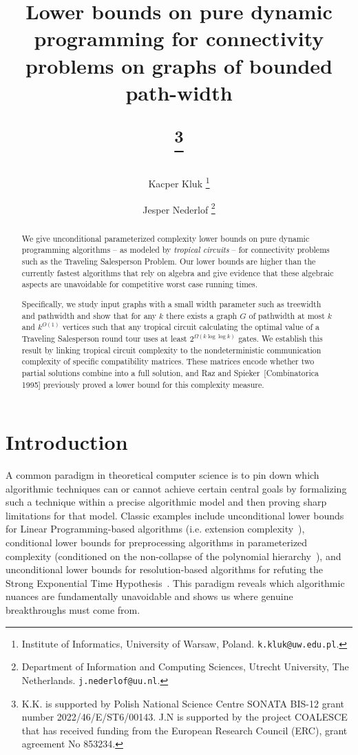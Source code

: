 \documentclass[11pt,a4paper]{article}
\begin{document}
\iftrue
\author{
  Kacper Kluk%
  \thanks{Institute of Informatics, University of Warsaw, Poland. \texttt{k.kluk@uw.edu.pl}.}
  \and%
  Jesper Nederlof%
  \thanks{Department of Information and Computing Sciences, Utrecht University, The Netherlands. \texttt{j.nederlof@uu.nl}.}
}
\else
\author{}
\fi

\title{Lower bounds on pure dynamic programming for connectivity problems on graphs of bounded path-width
\iftrue
  \thanks{
  K.K. is supported by Polish National Science Centre SONATA BIS-12 grant number 2022/46/E/ST6/00143. J.N is supported by the project COALESCE that has received funding from the European Research Council (ERC), grant agreement No 853234.}\fi}

\date{}
\maketitle

\begin{abstract}
We give unconditional parameterized complexity lower bounds on pure dynamic programming algorithms -- as modeled by \emph{tropical circuits} -- for connectivity problems such as the Traveling Salesperson Problem. Our lower bounds are higher than the currently fastest algorithms that rely on algebra and give evidence that these algebraic aspects are unavoidable for competitive worst case running times. 

Specifically, we study input graphs with a small width parameter such as treewidth and pathwidth and show that for any $k$ there exists a graph $G$ of pathwidth at most $k$ and $k^{O(1)}$ vertices such that any tropical circuit calculating the optimal value of a Traveling Salesperson round tour uses at least $2^{\Omega(k \log \log k)}$ gates. We establish this result by linking tropical circuit complexity to the nondeterministic communication complexity of specific compatibility matrices. These matrices encode whether two partial solutions combine into a full solution, and Raz and Spieker~[Combinatorica 1995] previously proved a lower bound for this complexity measure.
\end{abstract}




\section{Introduction}
A common paradigm in theoretical computer science is to pin down which algorithmic techniques can or cannot achieve certain central goals by formalizing such a technique within a precise algorithmic model and then proving sharp limitations for that model. Classic examples include unconditional lower bounds for Linear Programming-based algorithms (i.e. extension complexity~\cite{FioriniMPTW15,Rothvoss17}), conditional lower bounds for preprocessing algorithms in parameterized complexity (conditioned on the non-collapse of the polynomial hierarchy~\cite{BodlaenderDFH09,FortnowS11}), and unconditional lower bounds for resolution-based algorithms for refuting the Strong Exponential Time Hypothesis~\cite{BeckI13}. This paradigm reveals which algorithmic nuances are fundamentally unavoidable and shows us where genuine breakthroughs must come from.
\end{document}
